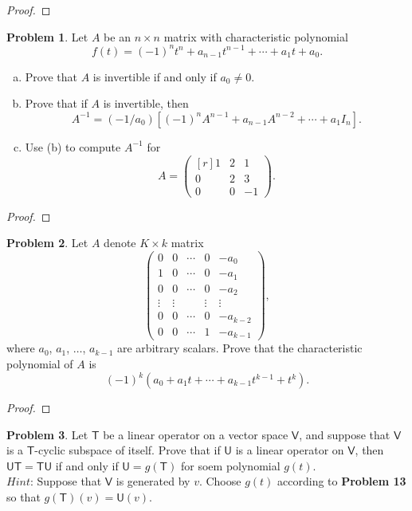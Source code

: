 \documentclass[12pt]{book}
\theoremstyle{definition}
\newtheorem{problem}{Problem}
\begin{document}
	\begin{proof}
	\end{proof}
	\newpage
	\begin{problem}
		Let $A$ be an $n\times n$ matrix with characteristic polynomial $$f(t)=(-1)^nt^n+a_{n-1}t^{n-1}+\cdots+a_1t+a_0.$$
		\begin{enumerate}[(a)]
			\item Prove that $A$ is invertible if and only if $a_0\neq 0$.
			\item Prove that if $A$ is invertible, then $$A^{-1}=(-1/a_0)\left[(-1)^nA^{n-1}+a_{n-1}A^{n-2}+\cdots+a_1 I_n\right].$$
			\item Use (b) to compute $A^{-1}$ for $$A=\begin{pmatrix*}[r]
				1&2&1\\0&2&3\\0&0&-1
			\end{pmatrix*}.$$
		\end{enumerate}
	\end{problem}
	\begin{proof}
	\end{proof}
	\newpage
	\begin{problem}
		Let $A$ denote $K\times k$ matrix
		$$\begin{pmatrix}
			0&0&\cdots&0&-a_0\\
			1&0&\cdots&0&-a_1\\
			0&0&\cdots&0&-a_2\\
			\vdots&\vdots&&\vdots&\vdots\\
			0&0&\cdots&0&-a_{k-2}\\
			0&0&\cdots&1&-a_{k-1}
		\end{pmatrix},$$
		where $a_0$, $a_1$, $\ldots$, $a_{k-1}$ are arbitrary scalars. Prove that the characteristic polynomial of $A$ is
		$$(-1)^k(a_0+a_1t+\cdots +a_{k-1}t^{k-1}+t^k).$$
	\end{problem}
	\begin{proof}
	\end{proof}
	\newpage
	\begin{problem}
		Let $\mathsf{T}$ be a linear operator on a vector space $\mathsf{V}$, and suppose that $\mathsf{V}$ is a $\mathsf{T}$-cyclic subspace of itself. Prove that if $\mathsf{U}$ is a linear operator on $\mathsf{V}$, then $\mathsf{UT}=\mathsf{TU}$ if and only if $\mathsf{U}=g(\mathsf{T})$ for soem polynomial $g(t)$.\\
		$Hint$: Suppose that $\mathsf{V}$ is generated by $v$. Choose $g(t)$ according to \textbf{Problem 13} so that $g(\mathsf{T})(v)=\mathsf{U}(v)$.
	\end{problem}
\end{document}
